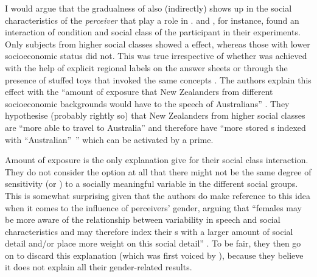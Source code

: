 I would argue that the gradualness of  also (indirectly) shows up in the social characteristics of the \emph{perceiver} that play a role in .
\citealt{hayetal2006a} and \citealt{haydrager2010}, for instance, found an interaction of  condition and social class of the participant in their experiments.
Only subjects from higher social classes showed a  effect, whereas those with lower socioeconomic status did not.
This was true irrespective of whether  was achieved with the help of explicit regional labels on the answer sheets or through the presence of stuffed toys that invoked the same concepts \parencite[cf.][878]{haydrager2010}.
The authors explain this effect with the ``amount of exposure  that New Zealanders from different socioeconomic backgrounds would have to the speech of Australians'' \parencite[878]{haydrager2010}.
They hypothesise (probably rightly so) that New Zealanders from higher social classes are ``more able to travel to Australia'' and therefore have ``more stored s indexed with ``Australian''~'' which can be activated by a prime.

Amount of exposure is the only explanation \citeauthor{haydrager2010} give for their social class interaction.
They do not consider the option at all that there might not be the same degree of sensitivity (or ) to a socially meaningful variable in the different social groups.
This is somewhat surprising given that the authors do make reference to this idea when it comes to the influence of perceivers' gender, arguing that ``females may be more aware of the relationship between variability in speech and social characteristics and may therefore index their s with a larger amount of social detail and/or place more weight on this social detail'' \parencite[884]{haydrager2010}.
To be fair, they then go on to discard this explanation (which was first voiced by \citealt{drager2005}), because they believe it does not explain all their gender-related results.

